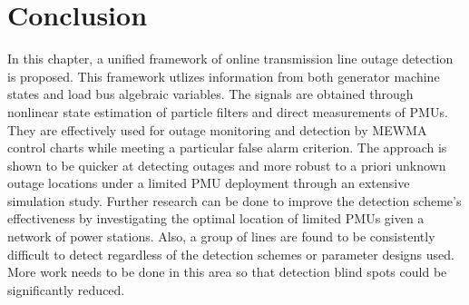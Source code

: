 \section{Conclusion}
\label{ch4:sec:conclusion}
In this chapter, a unified framework of online transmission line outage detection is proposed. This framework utlizes information from both generator machine states and load bus algebraic variables. The signals are obtained through nonlinear state estimation of particle filters and direct measurements of PMUs. They are effectively used for outage monitoring and detection by MEWMA control charts while meeting a particular false alarm criterion. The approach is shown to be quicker at detecting outages and more robust to a priori unknown outage locations under a limited PMU deployment through an extensive simulation study. Further research can be done to improve the detection scheme's effectiveness by investigating the optimal location of limited PMUs given a network of power stations. Also, a group of lines are found to be consistently difficult to detect regardless of the detection schemes or parameter designs used. More work needs to be done in this area so that detection blind spots could be significantly reduced. 








